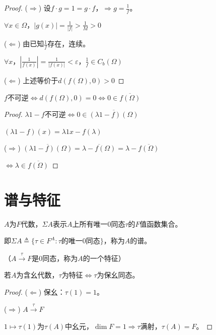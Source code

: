 \documentclass[lang=cn,a4paper,newtx,section]{elegantbook}
\begin{document}
\begin{proof}
  ($\Rightarrow$) 设$f \cdot g = 1 = g \cdot f$，$\Rightarrow g = \frac{1}{f}$。
  
  $\forall x \in \Omega$，$|g(x)| = \frac{1}{|f|} > \frac{1}{M} > 0$
  
  ($\Leftarrow$) 由已知$\frac{1}{f}$存在，连续。
  
  $\forall x$，$\left|\frac{1}{f(x)}\right| = \frac{1}{|f(x)|} < \varepsilon$，$\frac{1}{f} \in C_b(\Omega)$
  
  ($\Leftarrow$) 上述等价于$d(f(\Omega), 0) > 0$
  
  \end{proof}
\begin{proposition}
    $f$不可逆$\Longleftrightarrow d(f(\Omega), 0) = 0 \Longleftrightarrow 0 \in \overline{f(\Omega)}$

\end{proposition}
\begin{proof}
  $\lambda 1 - f$不可逆$\Longleftrightarrow 0 \in \overline{(\lambda 1 - f)(\Omega)}$
  
  $(\lambda 1 - f)(x) = \lambda 1 x - f(\lambda)$
  
  ($\Rightarrow$) $\overline{(\lambda 1 - f)(\Omega)} = \overline{\lambda - f(\Omega)} = \lambda - \overline{f(\Omega)}$
  
  $\Longleftrightarrow \lambda \in \overline{f(\Omega)}$
\end{proof}

\section{谱与特征}

\begin{definition}[谱集]
  $A$为$F$代数，$\Sigma A$表示$A$上所有唯一0同态$\tau$的$F$值函数集合。
  
  即$\Sigma A \triangleq \{\tau \in F^A : \tau$的唯一0同态$\}$，称为$A$的谱。
  
  （$A \xrightarrow{\tau} F$是0同态，称为$A$的一个特征）
\end{definition}

\begin{proposition}
  若$A$为含幺代数，$\tau$为特征$\Longleftrightarrow \tau$为保幺同态。
\end{proposition}

\begin{proof}
  ($\Leftarrow$) 保幺：$\tau(1) = 1$。
  
  ($\Rightarrow$) $A \xrightarrow{\tau} F$
  
  $1 \longmapsto \tau(1)$为$\tau(A)$中幺元，$\dim F = 1 \Rightarrow \tau$满射，$\tau(A) = F$。
\end{proof}
\end{document}
